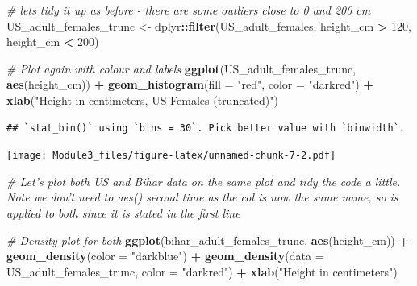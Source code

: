 \documentclass[]{book}
\newenvironment{Shaded}{\begin{snugshade}}{\end{snugshade}}
\newcommand{\KeywordTok}[1]{\textcolor[rgb]{0.13,0.29,0.53}{\textbf{#1}}}
\newcommand{\DataTypeTok}[1]{\textcolor[rgb]{0.13,0.29,0.53}{#1}}
\newcommand{\DecValTok}[1]{\textcolor[rgb]{0.00,0.00,0.81}{#1}}
\newcommand{\StringTok}[1]{\textcolor[rgb]{0.31,0.60,0.02}{#1}}
\newcommand{\CommentTok}[1]{\textcolor[rgb]{0.56,0.35,0.01}{\textit{#1}}}
\newcommand{\OperatorTok}[1]{\textcolor[rgb]{0.81,0.36,0.00}{\textbf{#1}}}
\newcommand{\NormalTok}[1]{#1}
\theoremstyle{definition}
\theoremstyle{definition}
\theoremstyle{definition}
\theoremstyle{remark}
\begin{document}
\begin{Shaded}
\begin{Highlighting}[]
\CommentTok{# lets tidy it up as before - there are some outliers close to 0 and 200 cm}
\NormalTok{US_adult_females_trunc <-}\StringTok{ }\NormalTok{dplyr}\OperatorTok{::}\KeywordTok{filter}\NormalTok{(US_adult_females, height_cm }\OperatorTok{>}\StringTok{ }\DecValTok{120}\NormalTok{, height_cm }\OperatorTok{<}\StringTok{ }\DecValTok{200}\NormalTok{)}

\CommentTok{# Plot again with colour and labels}
\KeywordTok{ggplot}\NormalTok{(US_adult_females_trunc, }\KeywordTok{aes}\NormalTok{(height_cm)) }\OperatorTok{+}\StringTok{ }
\StringTok{  }\KeywordTok{geom_histogram}\NormalTok{(}\DataTypeTok{fill =} \StringTok{"red"}\NormalTok{, }\DataTypeTok{color =} \StringTok{"darkred"}\NormalTok{) }\OperatorTok{+}\StringTok{ }
\StringTok{  }\KeywordTok{xlab}\NormalTok{(}\StringTok{"Height in centimeters, US Females (truncated)"}\NormalTok{)}
\end{Highlighting}
\end{Shaded}

\begin{verbatim}
## `stat_bin()` using `bins = 30`. Pick better value with `binwidth`.
\end{verbatim}

\texttt{[image: Module3\_files/figure-latex/unnamed-chunk-7-2.pdf]}

\begin{Shaded}
\begin{Highlighting}[]
\CommentTok{# Let's plot both US and Bihar data on the same plot and tidy the code a little.  Note we don't need to aes() second time as the col is now the same name, so is applied to both since it is stated in the first line}

\CommentTok{# Density plot for both}
\KeywordTok{ggplot}\NormalTok{(bihar_adult_females_trunc, }\KeywordTok{aes}\NormalTok{(height_cm)) }\OperatorTok{+}\StringTok{ }
\StringTok{  }\KeywordTok{geom_density}\NormalTok{(}\DataTypeTok{color =} \StringTok{"darkblue"}\NormalTok{) }\OperatorTok{+}
\StringTok{  }\KeywordTok{geom_density}\NormalTok{(}\DataTypeTok{data =}\NormalTok{ US_adult_females_trunc, }\DataTypeTok{color =} \StringTok{"darkred"}\NormalTok{) }\OperatorTok{+}\StringTok{ }
\StringTok{  }\KeywordTok{xlab}\NormalTok{(}\StringTok{"Height in centimeters"}\NormalTok{)}
\end{Highlighting}
\end{Shaded}
\end{document}

